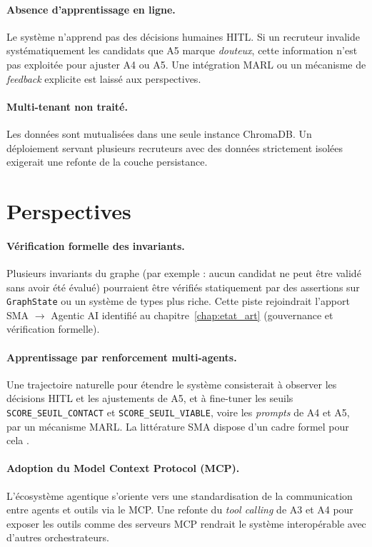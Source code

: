 \paragraph{Absence d'apprentissage en ligne.}
Le système n'apprend pas des décisions humaines HITL. Si un recruteur invalide systématiquement les candidats que A5 marque \emph{douteux}, cette information n'est pas exploitée pour ajuster A4 ou A5. Une intégration MARL ou un mécanisme de \emph{feedback} explicite est laissé aux perspectives.

\paragraph{Multi-tenant non traité.}
Les données sont mutualisées dans une seule instance ChromaDB. Un déploiement servant plusieurs recruteurs avec des données strictement isolées exigerait une refonte de la couche persistance.

\section{Perspectives}

\paragraph{Vérification formelle des invariants.}
Plusieurs invariants du graphe (par exemple : aucun candidat ne peut être validé sans avoir été évalué) pourraient être vérifiés statiquement par des assertions sur \texttt{GraphState} ou un système de types plus riche. Cette piste rejoindrait l'apport SMA $\rightarrow$ Agentic AI identifié au chapitre~\ref{chap:etat_art} (gouvernance et vérification formelle).

\paragraph{Apprentissage par renforcement multi-agents.}
Une trajectoire naturelle pour étendre le système consisterait à observer les décisions HITL et les ajustements de A5, et à fine-tuner les seuils \texttt{SCORE\_SEUIL\_CONTACT} et \texttt{SCORE\_SEUIL\_VIABLE}, voire les \emph{prompts} de A4 et A5, par un mécanisme MARL. La littérature SMA dispose d'un cadre formel pour cela \cite{sma_cmu_marl}.

\paragraph{Adoption du Model Context Protocol (MCP).}
L'écosystème agentique s'oriente vers une standardisation de la communication entre agents et outils via le MCP. Une refonte du \emph{tool calling} de A3 et A4 pour exposer les outils comme des serveurs MCP rendrait le système interopérable avec d'autres orchestrateurs.

